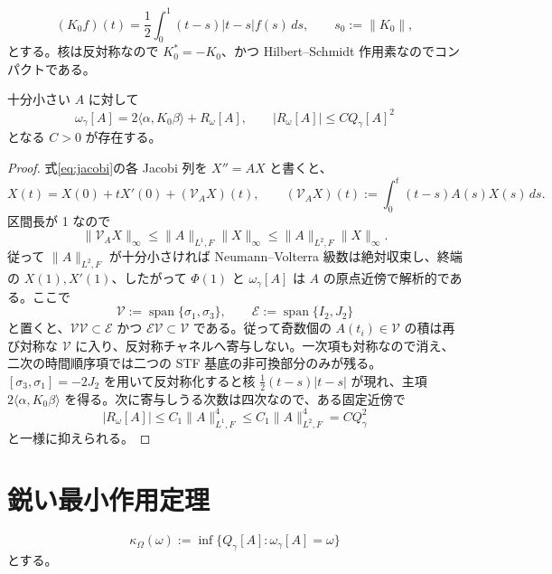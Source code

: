 \begin{definition}
\begin{equation}
(K_0f)(t)=\frac12\int_0^1(t-s)|t-s|f(s)\,ds,
\qquad s_0:=\|K_0\|,
\label{eq:K0}
\end{equation}
とする。核は反対称なので $K_0^*=-K_0$、かつ Hilbert--Schmidt 作用素なのでコンパクトである。
\end{definition}

\begin{lemma}[厳密終端写像の小振幅展開]
\label{lem:endpoint-expansion}
十分小さい $A$ に対して
\begin{equation}
\omega_\gamma[A]=2\langle\alpha,K_0\beta\rangle+R_\omega[A],
\qquad |R_\omega[A]|\le C Q_\gamma[A]^2
\label{eq:endpoint-expansion}
\end{equation}
となる $C>0$ が存在する。
\end{lemma}
\begin{proof}
式\eqref{eq:jacobi}の各 Jacobi 列を $X''=AX$ と書くと、
\[
X(t)=X(0)+tX'(0)+(\mathcal V_A X)(t),\qquad
(\mathcal V_A X)(t):=\int_0^t(t-s)A(s)X(s)\,ds .
\]
区間長が 1 なので
\[
\|\mathcal V_A X\|_\infty
\le \|A\|_{L^1,F}\|X\|_\infty
\le \|A\|_{L^2,F}\|X\|_\infty .
\]
従って $\|A\|_{L^2,F}$ が十分小さければ Neumann--Volterra 級数は絶対収束し、終端の $X(1),X'(1)$、したがって $\Phi(1)$ と $\omega_\gamma[A]$ は $A$ の原点近傍で解析的である。ここで
\[
\mathcal V:=\operatorname{span}\{\sigma_1,\sigma_3\},\qquad
\mathcal E:=\operatorname{span}\{I_2,J_2\}
\]
と置くと、$\mathcal V\mathcal V\subset\mathcal E$ かつ $\mathcal E\mathcal V\subset\mathcal V$ である。従って奇数個の $A(t_i)\in\mathcal V$ の積は再び対称な $\mathcal V$ に入り、反対称チャネルへ寄与しない。一次項も対称なので消え、二次の時間順序項では二つの STF 基底の非可換部分のみが残る。$[\sigma_3,\sigma_1]=-2J_2$ を用いて反対称化すると核 $\frac12(t-s)|t-s|$ が現れ、主項 $2\langle\alpha,K_0\beta\rangle$ を得る。次に寄与しうる次数は四次なので、ある固定近傍で
\[
|R_\omega[A]|\le C_1\|A\|_{L^1,F}^4
\le C_1\|A\|_{L^2,F}^4
=C Q_\gamma^2
\]
と一様に抑えられる。
\end{proof}

\section{鋭い最小作用定理}
\begin{equation}
\kappa_\Omega(\omega):=\inf\{Q_\gamma[A]:\omega_\gamma[A]=\omega\}
\label{eq:value}
\end{equation}
とする。

